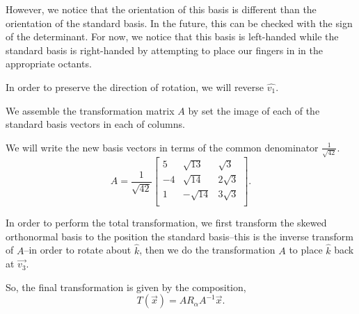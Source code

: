 \documentclass{article}
\begin{document}
However, we notice that the orientation of this basis is different than the orientation of the standard basis. In the future, this can be checked with the sign of the determinant. For now, we notice that this basis is left-handed while the standard basis is right-handed by attempting to place our fingers in in the appropriate octants. 

In order to preserve the direction of rotation, we will reverse $\hat{v_1}$. 

We assemble the transformation matrix $A$ by set the image of each of the standard basis vectors in each of columns.

We will write the new basis vectors in terms of the common denominator $\frac{1}{\sqrt{42}}$.
\[
  A = \frac{1}{\sqrt{42} }\begin{bmatrix} 
    5 & \sqrt{13} & \sqrt{3} \\
    -4 & \sqrt{14} & 2\sqrt{3} \\
    1 & -\sqrt{14} & 3\sqrt{3} \\ 
  \end{bmatrix} 
.\] 

In order to perform the total transformation, we first transform the skewed orthonormal basis to the position the standard basis--this is the inverse transform of $A$--in order to rotate about $\hat{k}$, then we do the transformation $A $ to place $\hat{k}$ back at $\vec{v_3}$. 

So, the final transformation is given by the composition,
\[
T(\vec{x})=A R_{\alpha} A^{-1} \vec{x}
.\] 
\end{document}
